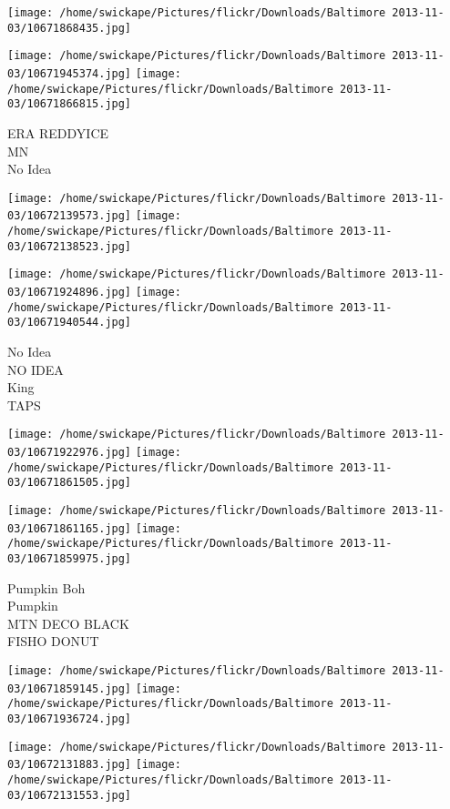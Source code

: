 \documentclass[10pt,letterpaper]{article}
\begin{document}
\texttt{[image: /home/swickape/Pictures/flickr/Downloads/Baltimore 2013-11-03/10671868435.jpg]}

\vspace{0.25in}
\texttt{[image: /home/swickape/Pictures/flickr/Downloads/Baltimore 2013-11-03/10671945374.jpg]}
\texttt{[image: /home/swickape/Pictures/flickr/Downloads/Baltimore 2013-11-03/10671866815.jpg]}

ERA REDDYICE\\
MN\\
No Idea\\
\pagebreak

\texttt{[image: /home/swickape/Pictures/flickr/Downloads/Baltimore 2013-11-03/10672139573.jpg]}
\texttt{[image: /home/swickape/Pictures/flickr/Downloads/Baltimore 2013-11-03/10672138523.jpg]}

\texttt{[image: /home/swickape/Pictures/flickr/Downloads/Baltimore 2013-11-03/10671924896.jpg]}
\texttt{[image: /home/swickape/Pictures/flickr/Downloads/Baltimore 2013-11-03/10671940544.jpg]}

No Idea\\
NO IDEA\\
King\\
TAPS\\
\pagebreak

\texttt{[image: /home/swickape/Pictures/flickr/Downloads/Baltimore 2013-11-03/10671922976.jpg]}
\texttt{[image: /home/swickape/Pictures/flickr/Downloads/Baltimore 2013-11-03/10671861505.jpg]}

\texttt{[image: /home/swickape/Pictures/flickr/Downloads/Baltimore 2013-11-03/10671861165.jpg]}
\texttt{[image: /home/swickape/Pictures/flickr/Downloads/Baltimore 2013-11-03/10671859975.jpg]}

Pumpkin Boh\\
Pumpkin\\
MTN DECO BLACK\\
FISHO DONUT\\
\pagebreak

\texttt{[image: /home/swickape/Pictures/flickr/Downloads/Baltimore 2013-11-03/10671859145.jpg]}
\texttt{[image: /home/swickape/Pictures/flickr/Downloads/Baltimore 2013-11-03/10671936724.jpg]}

\texttt{[image: /home/swickape/Pictures/flickr/Downloads/Baltimore 2013-11-03/10672131883.jpg]}
\texttt{[image: /home/swickape/Pictures/flickr/Downloads/Baltimore 2013-11-03/10672131553.jpg]}
\end{document}
